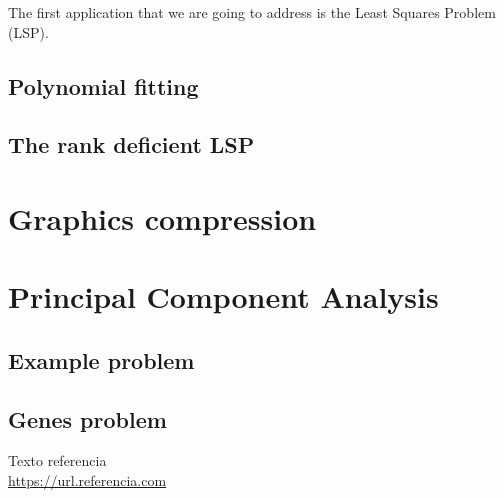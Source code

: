 \documentclass[11pt,a4paper]{article}
\begin{document}
The first application that we are going to address is the Least Squares Problem (LSP).

\subsection{Polynomial fitting}

\subsection{The rank deficient LSP}

\section{Graphics compression}

\section{Principal Component Analysis}

\subsection{Example problem}

\subsection{Genes problem}

\newpage

\begin{thebibliography}{5}

Texto referencia
\\\url{https://url.referencia.com}

\end{thebibliography}
\end{document}
